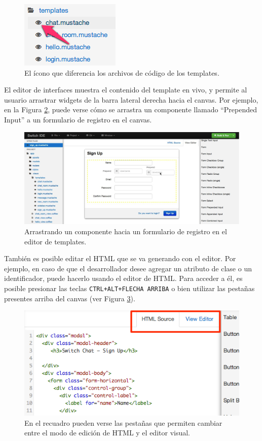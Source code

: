 \documentclass[12pt,spanish,letter]{report}
\makeatletter
\def\maxwidth{\ifdim\Gin@nat@width>\linewidth\linewidth
\else\Gin@nat@width\fi}
\let\Oldincludegraphics\includegraphics
\renewcommand{\includegraphics}[1]{\Oldincludegraphics[width=\maxwidth]{#1}}
\makeatother
\begin{document}
\begin{figure}[htbp]
\centering
\includegraphics{figures/tutorial-template-icon.png}
\caption{El ícono que diferencia los archivos de código de los
templates. \label{figures:tutorial-template-icon}}
\end{figure}

El editor de interfaces muestra el contenido del template en vivo, y
permite al usuario arrastrar widgets de la barra lateral derecha hacia
el canvas. Por ejemplo, en la Figura \ref{figures:tutorial-drag}, puede
verse cómo se arrastra un componente llamado ``Prepended Input'' a un
formulario de registro en el canvas.

\begin{figure}[htbp]
\centering
\includegraphics{figures/tutorial-drag.png}
\caption{Arrastrando un componente hacia un formulario de registro en el
editor de templates. \label{figures:tutorial-drag}}
\end{figure}

También es posible editar el HTML que se va generando con el editor. Por
ejemplo, en caso de que el desarrollador desee agregar un atributo de
clase o un identificador, puede hacerlo usando el editor de HTML. Para
acceder a él, es posible presionar las teclas
\texttt{CTRL+ALT+FLECHA ARRIBA} o bien utilizar las pestañas presentes
arriba del canvas (ver Figura \ref{figures:tutorial-html}).

\begin{figure}[htbp]
\centering
\includegraphics{figures/tutorial-html.png}
\caption{En el recuadro pueden verse las pestañas que permiten cambiar
entre el modo de edición de HTML y el editor visual.
\label{figures:tutorial-html}}
\end{figure}
\end{document}

